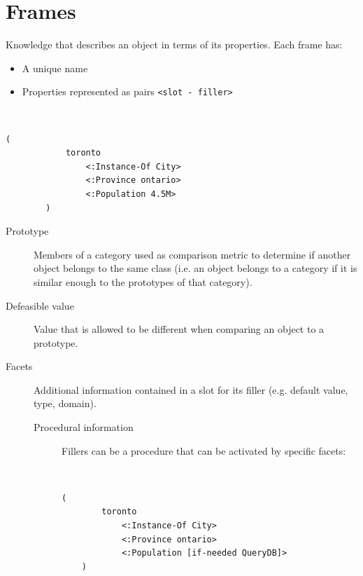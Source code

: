 \section{Frames}
Knowledge that describes an object in terms of its properties.
Each frame has:
\begin{itemize}
    \item A unique name
    \item Properties represented as pairs \texttt{<slot - filler>}
\end{itemize}

\begin{example}
    \phantom{}\\[-1em]
    \begin{lstlisting}[mathescape=true, language={}] 
        (
            toronto
                <:Instance-Of City>
                <:Province ontario>
                <:Population 4.5M>
        )
    \end{lstlisting}
\end{example}

\begin{description}
    \item[Prototype] 
        Members of a category used as comparison metric to determine if another object belongs to the same class
        (i.e. an object belongs to a category if it is similar enough to the prototypes of that category).

    \item[Defeasible value] 
        Value that is allowed to be different when comparing an object to a prototype.

    \item[Facets] 
        Additional information contained in a slot for its filler (e.g. default value, type, domain).

        \begin{description}
            \item[Procedural information] 
                Fillers can be a procedure that can be activated by specific facets:
                \begin{example}
                    \phantom{}\\[-1em]
                    \begin{lstlisting}[mathescape=true, language={}] 
    (
        toronto
            <:Instance-Of City>
            <:Province ontario>
            <:Population [if-needed QueryDB]>
    )
                    \end{lstlisting}
                \end{example}
        \end{description}
\end{description}